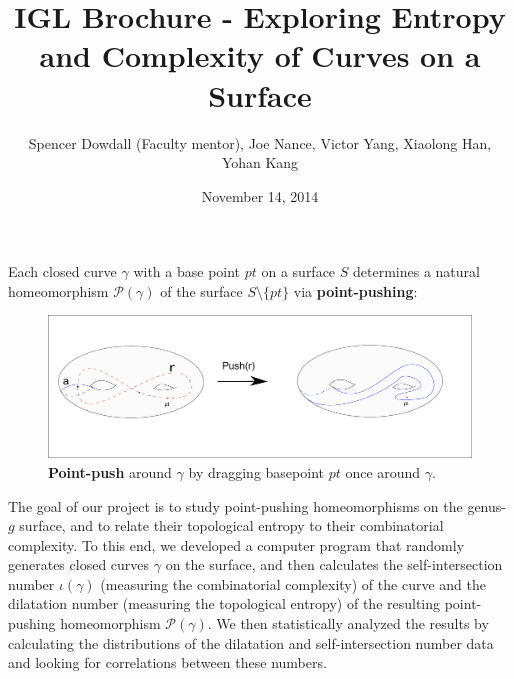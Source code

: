 \documentclass{article}
\begin{document}
	
	\title{{\Large IGL Brochure - Exploring Entropy and Complexity of Curves on a Surface}}
	\author{Spencer Dowdall (Faculty mentor),
		Joe Nance,
		Victor Yang,
		Xiaolong Han,
		Yohan Kang}
	\date{November 14, 2014}
	\maketitle
	
	Each closed curve $\gamma$ with a base point $pt$ on a surface $S$ determines a natural homeomorphism $\mathcal{P}(\gamma)$ of the surface $S\setminus\{pt\}$ via \textbf{point-pushing}:
	
	\begin{figure}[h]
		\begin{center}
			\includegraphics[width=12cm]{Ex_Point-Pushing_Homeomorphism.pdf}
			\caption{{\bf Point-push} around $\gamma$ by dragging basepoint $pt$ once around $\gamma$.}
		\end{center}
	\end{figure}
	
	The goal of our project is to study point-pushing homeomorphisms on the genus-$g$ surface, and to relate their topological entropy to their combinatorial complexity. To this end, we developed a computer program that 
	randomly generates closed curves $\gamma$ on the surface, and then calculates the self-intersection number $\iota(\gamma)$ (measuring the combinatorial complexity) of the curve and the dilatation number (measuring the topological entropy) of the resulting point-pushing homeomorphism $\mathcal{P}(\gamma)$. We then statistically analyzed the results by calculating the distributions of the dilatation and self-intersection number data and looking for correlations between these numbers.
	
\end{document}
